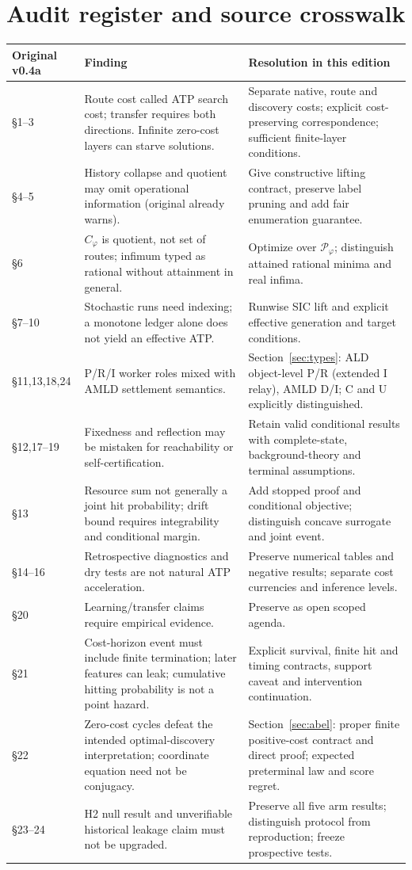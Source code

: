 \documentclass[11pt]{article}
\theoremstyle{definition}\newtheorem{definition}[theorem]{Definition}\newtheorem{example}[theorem]{Example}\newtheorem{conjecture}[theorem]{Conjecture}
\begin{document}
\section{Audit register and source crosswalk}
\small
\begin{longtable}{p{.17\linewidth}p{.34\linewidth}p{.41\linewidth}}\toprule Original v0.4a & Finding & Resolution in this edition\\\midrule\endhead
\S1--3 & Route cost called ATP search cost; transfer requires both directions. Infinite zero-cost layers can starve solutions. & Separate native, route and discovery costs; explicit cost-preserving correspondence; sufficient finite-layer conditions.\\
\S4--5 & History collapse and quotient may omit operational information (original already warns). & Give constructive lifting contract, preserve label pruning and add fair enumeration guarantee.\\
\S6 & $C_\varphi$ is quotient, not set of routes; infimum typed as rational without attainment in general. & Optimize over $\mathcal P_\varphi$; distinguish attained rational minima and real infima.\\
\S7--10 & Stochastic runs need indexing; a monotone ledger alone does not yield an effective ATP. & Runwise SIC lift and explicit effective generation and target conditions.\\
\S11,13,18,24 & P/R/I worker roles mixed with AMLD settlement semantics. & Section~\ref{sec:types}: ALD object-level P/R (extended I relay), AMLD D/I; C and U explicitly distinguished.\\
\S12,17--19 & Fixedness and reflection may be mistaken for reachability or self-certification. & Retain valid conditional results with complete-state, background-theory and terminal assumptions.\\
\S13 & Resource sum not generally a joint hit probability; drift bound requires integrability and conditional margin. & Add stopped proof and conditional objective; distinguish concave surrogate and joint event.\\
\S14--16 & Retrospective diagnostics and dry tests are not natural ATP acceleration. & Preserve numerical tables and negative results; separate cost currencies and inference levels.\\
\S20 & Learning/transfer claims require empirical evidence. & Preserve as open scoped agenda.\\
\S21 & Cost-horizon event must include finite termination; later features can leak; cumulative hitting probability is not a point hazard. & Explicit survival, finite hit and timing contracts, support caveat and intervention continuation.\\
\S22 & Zero-cost cycles defeat the intended optimal-discovery interpretation; coordinate equation need not be conjugacy. & Section~\ref{sec:abel}: proper finite positive-cost contract and direct proof; expected preterminal law and score regret.\\
\S23--24 & H2 null result and unverifiable historical leakage claim must not be upgraded. & Preserve all five arm results; distinguish protocol from reproduction; freeze prospective tests.\\\bottomrule
\end{longtable}\normalsize
\end{document}
